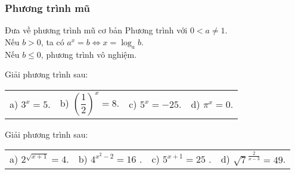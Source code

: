 \subsubsection{Phương trình mũ}
\begin{dang}{Đưa về phương trình mũ cơ bản}
Phương trình   với $ 0<a \ne 1 $.\\
Nếu $ b>0 $, ta có $ a^x=b \Leftrightarrow x=\log_a b $.\\
Nếu $ b\le 0 $, phương trình vô nghiệm.
\end{dang}
\begin{vd}%
Giải phương trình sau:

\begin{tabular}{@{}p{}@{}p{}@{}p{}@{}p{}@{}}
	a) $3^x=5$. &
	b) $\left(\dfrac{1}{2}\right)^x = 8$. &
	c) $5^x=-25$. &
	d) $\pi^x=0$.
\end{tabular}
\end{vd}
\begin{vd}%
Giải phương trình sau:

\begin{tabular}{@{}p{}@{}p{}@{}p{}@{}p{}@{}}
	a) $2^{\sqrt{x+1}}=4$. &
	b) $4^{x^2-2}= 16$ .&
	c) $5^{x+1}=25$ .&
	d) $\sqrt 7^{\frac{2}{x-3}}=49$.
\end{tabular}
\end{vd}

